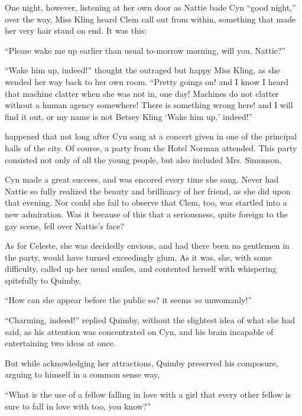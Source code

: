 One night, however, listening at her own door as Nattie bade Cyn ``good
night,'' over the way, Miss Kling heard Clem call out from within,
something that made her very hair stand on end. It was this:

``Please wake me up earlier than usual to-morrow morning, will you,
Nattie?''

``Wake him up, indeed!'' thought the outraged but happy Miss Kling, as she
wended her way back to her own room. ``Pretty goings on! and I know I
heard that machine clatter when she was not in, one day! Machines do not
clatter without a human agency somewhere! There is something wrong here!
and I will find it out, or my name is not Betsey Kling `Wake him up,'
indeed!''








 happened that not long after Cyn sang at a concert given in one of
the principal halls of the city. Of course, a party from the Hotel
Norman attended. This party consisted not only of all the young people,
but also included Mrs. Simonson.

Cyn made a great success, and was encored every time she sang. Never had
Nattie so fully realized the beauty and brilliancy of her friend, as she
did upon that evening. Nor could she fail to observe that Clem, too, was
startled into a new admiration. Was it because of this that a
seriousness, quite foreign to the gay scene, fell over Nattie's face?

As for Celeste, she was decidedly envious, and had there been no
gentlemen in the party, would have turned exceedingly glum. As it was,
she, with some difficulty, called up her usual smiles, and contented
herself with whispering spitefully to Quimby,

``How can she appear before the public so? it seems \emph{so} unwomanly!''

``Charming, indeed!'' replied Quimby, without the slightest idea of what
she had said, as his attention was concentrated on Cyn, and his brain
incapable of entertaining two ideas at once.

But while acknowledging her attractions, Quimby preserved his composure,
arguing to himself in a common sense way,

``What is the use of a fellow falling in love with a girl that every
other fellow is sure to fall in love with too, you know?''

